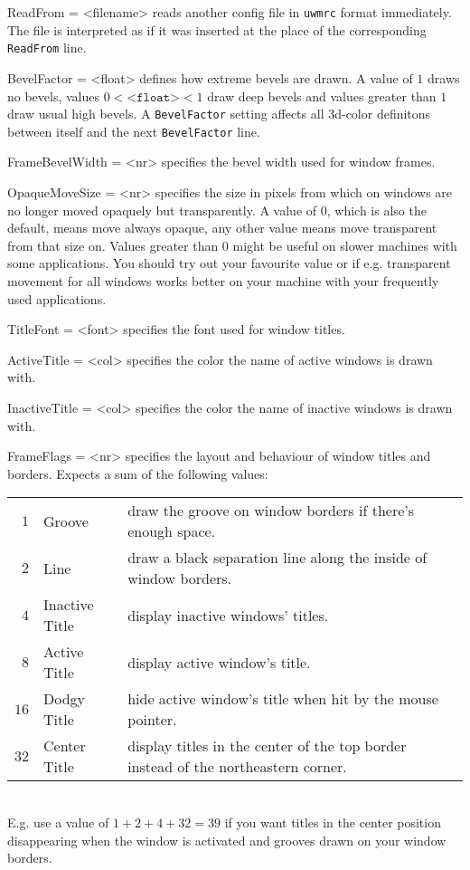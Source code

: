 \documentclass[10pt,a4paper]{article}
\newenvironment{ttdesc}[1]{
   \begin{list}{}{
          \renewcommand{\makelabel}[1]{\texttt{##1\hfill}}}}{\end{list}}
\begin{document}
\begin{ttdesc}{description}
\item[ReadFrom = <filename>] reads another config file in \texttt{uwmrc} format immediately. The file is interpreted as if it was inserted at the place of the corresponding \texttt{ReadFrom} line.

\item[BevelFactor = <float>] defines how extreme bevels are drawn. A value of $1$ draws no bevels, values $0<\texttt{<float>}<1$ draw deep bevels and values greater than $1$ draw usual high bevels. A \texttt{BevelFactor} setting affects all 3d-color definitons between itself and the next \texttt{BevelFactor} line.

\item[FrameBevelWidth = <nr>] specifies the bevel width used for window frames.

\item[OpaqueMoveSize = <nr>] specifies the size in pixels from which on windows are no longer moved opaquely but transparently. A value of 0, which is also the default, means move always opaque, any other value means move transparent from that size on. Values greater than 0 might be useful on slower machines with some applications. You should try out your favourite value or if e.g. transparent movement for all windows works better on your machine with your frequently used applications.

\item[TitleFont = <font>] specifies the font used for window titles.

\item[ActiveTitle = <col>] specifies the color the name of active windows is drawn with.

\item[InactiveTitle = <col>] specifies the color the name of inactive windows is drawn with.

\item[FrameFlags = <nr>] specifies the layout and behaviour of window titles and borders. Expects a sum of the following values:\\
\begin{tabular}{rlp{7cm}l}
$1$  & Groove & draw the groove on window borders if there's enough space.\\
$2$  & Line & draw a black separation line along the inside of window borders.\\
$4$  & Inactive Title & display inactive windows' titles.\\
$8$  & Active Title & display active window's title.\\
$16$ & Dodgy Title & hide active window's title when hit by the mouse pointer.\\
$32$ & Center Title & display titles in the center of the top border instead of the northeastern corner.\\
\end{tabular}\\
E.g. use a value of $1+2+4+32=39$ if you want titles in the center position disappearing when the window is activated and grooves drawn on your window borders. 


\end{ttdesc}
\end{document}
